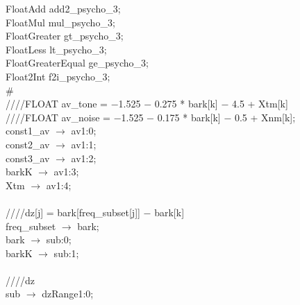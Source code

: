 \hspace*{2em}FloatAdd add2\_psycho\_3; \\
\hspace*{2em}FloatMul mul\_psycho\_3; \\
\hspace*{2em}FloatGreater gt\_psycho\_3; \\
\hspace*{2em}FloatLess lt\_psycho\_3; \\
\hspace*{2em}FloatGreaterEqual ge\_psycho\_3; \\
\hspace*{2em}Float2Int f2i\_psycho\_3; \\
\# \\
\hspace*{2em}////FLOAT av\_tone = $-$1.525 $-$ 0.275 * bark[k] $-$ 4.5 + Xtm[k] \\
\hspace*{2em}////FLOAT av\_noise = $-$1.525 $-$ 0.175 * bark[k] $-$ 0.5 + Xnm[k]; \\
\hspace*{2em}const1\_av $\rightarrow$ av1:0; \\
\hspace*{2em}const2\_av $\rightarrow$ av1:1; \\
\hspace*{2em}const3\_av $\rightarrow$ av1:2; \\
\hspace*{2em}barkK $\rightarrow$ av1:3; \\
\hspace*{2em}Xtm $\rightarrow$ av1:4; \\
   \\
   \hspace*{2em}////dz[j] = bark[freq\_subset[j]] $-$ bark[k] \\
   \hspace*{2em}freq\_subset $\rightarrow$ bark; \\
   \hspace*{2em}bark $\rightarrow$ sub:0; \\
   \hspace*{2em}barkK $\rightarrow$ sub:1; \\
   \\
   \hspace*{2em}////dz \\
   \hspace*{2em}sub $\rightarrow$ dzRange1:0; \\
   \\
